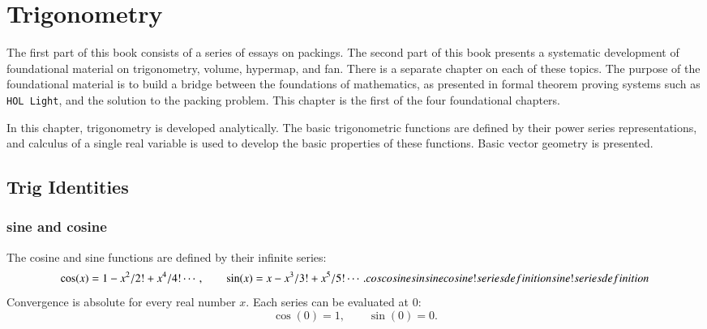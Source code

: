 
\chapter{Trigonometry}\label{part:trig}
%

The first part of this book consists of a series of essays
on packings.  The second part of this book presents
a systematic development of foundational material on
trigonometry, volume, hypermap, and fan.  There is a separate
chapter on each of these topics.  The purpose of the
foundational material is to build a bridge between
the foundations of mathematics, as presented in formal
theorem proving systems such as {\tt HOL Light}, and the
solution to the packing problem.  
This chapter is the first of the four foundational chapters.


In this chapter, trigonometry is developed analytically.  The basic
trigonometric functions are defined by their power series
representations, and calculus of a single real variable is used to
develop the basic properties of these functions.  Basic vector geometry is presented.

\section{Trig Identities}


\subsection{sine and cosine}

The cosine and sine functions are defined by their infinite series:%
%
    \begin{equation}\label{eqn:cos-def}\cos(x) = 1 - x^2/2! + x^4/4! \cdots,\qquad
  \sin(x) = x - x^3/3! + x^5/5! \cdots.
    \indy{Notation}{cos}%
    \indy{Index}{cosine}%
    \indy{Notation}{sin}%
    \indy{Index}{sine}%
    \indy{Index}{cosine!series definition}%
    \indy{Index}{sine!series definition}%
    \end{equation}
Convergence is absolute for every real number $x$.
Each series can be evaluated at $0$:
    \begin{equation}\label{eqn:cos0}
    \cos(0) = 1,\qquad \sin(0) = 0.
    \end{equation}

